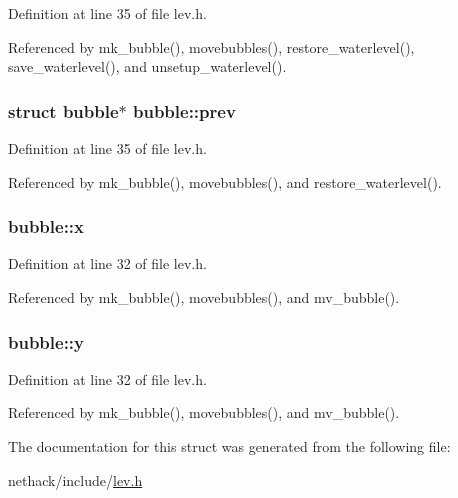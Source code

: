 Definition at line 35 of file lev.\+h.



Referenced by mk\+\_\+bubble(), movebubbles(), restore\+\_\+waterlevel(), save\+\_\+waterlevel(), and unsetup\+\_\+waterlevel().

\hypertarget{structbubble_a6c2ce0302072585c0362738cbe484c13}{
\subsubsection[{prev}]{\setlength{\rightskip}{0pt plus 5cm}struct {\bf bubble}$\ast$ bubble\+::prev}}\label{structbubble_a6c2ce0302072585c0362738cbe484c13}


Definition at line 35 of file lev.\+h.



Referenced by mk\+\_\+bubble(), movebubbles(), and restore\+\_\+waterlevel().

\hypertarget{structbubble_af7f9c88684a8f0b39df119b869f43daa}{
\subsubsection[{x}]{ bubble\+::x}}\label{structbubble_af7f9c88684a8f0b39df119b869f43daa}


Definition at line 32 of file lev.\+h.



Referenced by mk\+\_\+bubble(), movebubbles(), and mv\+\_\+bubble().

\hypertarget{structbubble_a5e49635e037d6587bfa6b7f977b0d77c}{
\subsubsection[{y}]{ bubble\+::y}}\label{structbubble_a5e49635e037d6587bfa6b7f977b0d77c}


Definition at line 32 of file lev.\+h.



Referenced by mk\+\_\+bubble(), movebubbles(), and mv\+\_\+bubble().



The documentation for this struct was generated from the following file\+:\begin{DoxyCompactItemize}
\item 
nethack/include/\hyperlink{lev_8h}{lev.\+h}\end{DoxyCompactItemize}
